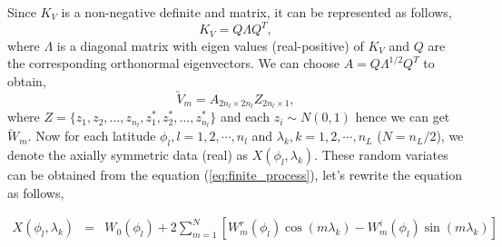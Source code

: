 		
	Since $K_V$ is a non-negative definite and matrix, it can be represented as follows,
	\[ K_V = Q\Lambda Q^T, \]
	where $\Lambda$ is a diagonal matrix with eigen values (real-positive) of $K_V$ and $Q$ are the corresponding orthonormal eigenvectors. We can choose $A = Q\Lambda^{1/2} Q^T$ to obtain,
	\[\utilde{V}_m=A_{2n_{l}\times 2n_{l}}Z_{2n_{l}\times 1},\]
	where $Z =\{z_1, z_2, \ldots, z_{n_l}, z_1^*, z_2^*, \ldots, z_{n_l}^*\}$ and each $z_i\sim N(0,1)$ hence we can get $\utilde{W}_m$.
	Now  for each latitude $\phi_l, l = 1, 2, \cdots, n_l$ and $\lambda_k, k = 1, 2, \cdots, n_L$ ($N = n_L/2$), we denote the axially symmetric data (real) as $X(\phi_l, \lambda_k)$. These random variates can be obtained from the equation (\ref{eq:finite_process}), let's rewrite the equation as follows,
			
	\begin{eqnarray} \label{eq:finite_process_2}
		X(\phi_l,\lambda_k) &=& W_0(\phi_l) + 2 \sum_{m =1}^N \left[W_m^r(\phi_l)\cos(m\lambda_k) - W_m^i(\phi_l)\sin(m \lambda_k)\right]
	\end{eqnarray}
		
	
	
	
		

